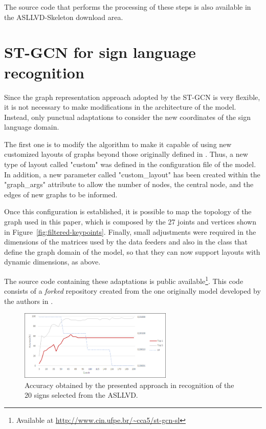 The source code that performs the processing of these steps is also available in the ASLLVD-Skeleton download area.


\section{ST-GCN for sign language recognition} 
\label{sec:st-gcn-for-sl-recognition}

Since the graph representation approach adopted by the ST-GCN is very flexible, it is not necessary to make modifications in the architecture of the model. Instead, only punctual adaptations to consider the new coordinates of the sign language domain.

The first one is to modify the algorithm to make it capable of using new customized layouts of graphs beyond those originally defined in \cite{st-gcn-2018}. Thus, a new type of layout called "custom" was defined in the configuration file of the model. In addition, a new parameter called "custom\_layout" has been created within the "graph\_args" attribute to allow the number of nodes, the central node, and the edges of new graphs to be informed.

Once this configuration is established, it is possible to map the topology of the graph used in this paper, which is composed by the 27 joints and vertices shown in  Figure~\ref{fig:filtered-keypoints}. Finally, small adjustments were required in the dimensions of the matrices used by the data feeders and also in the class that define the graph domain of the model, so that they can now support layouts with dynamic dimensions, as above.

The source code containing these adaptations is public available\footnote{
    Available at \url{http://www.cin.ufpe.br/~cca5/st-gcn-sl}
}. This code consists of a \textit{forked} repository created from the one originally model developed by the authors in \cite{st-gcn-2018}.


\begin{figure}[!t]
    \centering
    \includegraphics[width=0.65\textwidth]{images/results_20}
    \caption{Accuracy obtained by the presented approach in recognition of the 20 signs selected from the ASLLVD.}
    \label{fig:training-asllvd-20}
\end{figure}


